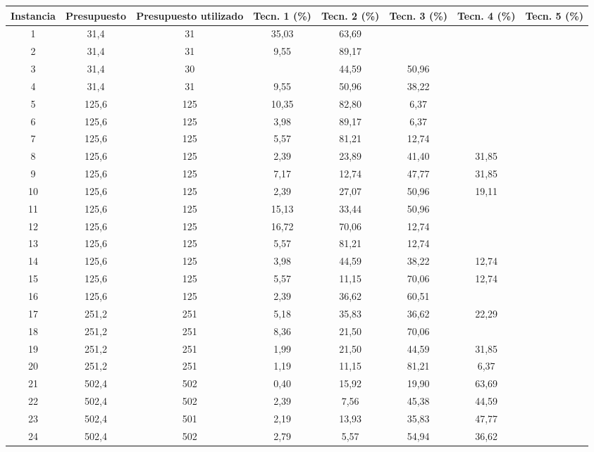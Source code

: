 \begin{table}
  \centering
  \begin{tabular}{cccccccc}
      \toprule
      Instancia & Presupuesto & Presupuesto utilizado & Tecn. 1 (\%) & Tecn. 2 (\%) & Tecn. 3 (\%) & Tecn. 4 (\%) & Tecn. 5 (\%) \\
      \midrule
      1 & 31,4 & 31 & 35,03 & 63,69 &  &  &  \\
      2 & 31,4 & 31 & 9,55 & 89,17 &  &  &  \\
      3 & 31,4 & 30 &  & 44,59 & 50,96 &  &  \\
      4 & 31,4 & 31 & 9,55 & 50,96 & 38,22 &  &  \\
      5 & 125,6 & 125 & 10,35 & 82,80 & 6,37 &  &  \\
      6 & 125,6 & 125 & 3,98 & 89,17 & 6,37 &  &  \\
      7 & 125,6 & 125 & 5,57 & 81,21 & 12,74 &  &  \\
      8 & 125,6 & 125 & 2,39 & 23,89 & 41,40 & 31,85 &  \\
      9 & 125,6 & 125 & 7,17 & 12,74 & 47,77 & 31,85 &  \\
      10 & 125,6 & 125 & 2,39 & 27,07 & 50,96 & 19,11 &  \\
      11 & 125,6 & 125 & 15,13 & 33,44 & 50,96 &  &  \\
      12 & 125,6 & 125 & 16,72 & 70,06 & 12,74 &  &  \\
      13 & 125,6 & 125 & 5,57 & 81,21 & 12,74 &  &  \\
      14 & 125,6 & 125 & 3,98 & 44,59 & 38,22 & 12,74 &  \\
      15 & 125,6 & 125 & 5,57 & 11,15 & 70,06 & 12,74 &  \\
      16 & 125,6 & 125 & 2,39 & 36,62 & 60,51 &  &  \\
      17 & 251,2 & 251 & 5,18 & 35,83 & 36,62 & 22,29 &  \\
      18 & 251,2 & 251 & 8,36 & 21,50 & 70,06 &  &  \\
      19 & 251,2 & 251 & 1,99 & 21,50 & 44,59 & 31,85 &  \\
      20 & 251,2 & 251 & 1,19 & 11,15 & 81,21 & 6,37 &  \\
      21 & 502,4 & 502 & 0,40 & 15,92 & 19,90 & 63,69 &  \\
      22 & 502,4 & 502 & 2,39 & 7,56 & 45,38 & 44,59 &  \\
      23 & 502,4 & 501 & 2,19 & 13,93 & 35,83 & 47,77 &  \\
      24 & 502,4 & 502 & 2,79 & 5,57 & 54,94 & 36,62 &  \\

\end{tabular}
\end{table}
